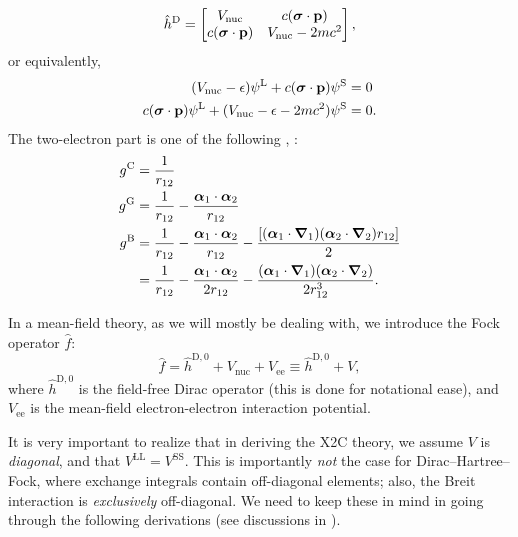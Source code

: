 \documentclass{article}
\begin{document}
\begin{equation}
    \hat{h}^{\mathrm{D}}=
    \begin{bmatrix}
        V_{\mathrm{nuc}} & c(\bm{\mathrm{\sigma}}\cdot\bm{\mathrm{p}})\\
        c(\bm{\mathrm{\sigma}}\cdot\bm{\mathrm{p}}) & V_{\mathrm{nuc}}-2mc^2
    \end{bmatrix},
\end{equation}
or equivalently,
\begin{align}
\label{eq:dirac_algebraic}
    (V_{\mathrm{nuc}}-\epsilon)\psi^{\mathrm{L}}+c(\bm{\mathrm{\sigma}}\cdot\bm{\mathrm{p}})\psi^{\mathrm{S}}&=0\\
    c(\bm{\mathrm{\sigma}}\cdot\bm{\mathrm{p}})\psi^{\mathrm{L}}+(V_{\mathrm{nuc}}-\epsilon-2mc^2)\psi^{\mathrm{S}}&=0.
\end{align}
The two-electron part is one of the following \cite[eqs. 3-7]{liuIdeasRelativisticQuantum2010}, \cite[eq. 6]{kelleyLargescaleDiracFock2013a}:
\begin{align}
    g^{\mathrm{C}}&=\frac{1}{r_{12}}\\
    g^{\mathrm{G}}&=\frac{1}{r_{12}}-\frac{\bm{\mathrm{\alpha}}_1\cdot\bm{\mathrm{\alpha}}_2}{r_{12}}\\
    g^{\mathrm{B}}&=\frac{1}{r_{12}}-\frac{\bm{\mathrm{\alpha}}_1\cdot\bm{\mathrm{\alpha}}_2}{r_{12}}-\frac{[(\bm{\mathrm{\alpha}}_1\cdot\bm{\mathrm{\nabla}}_1)(\bm{\mathrm{\alpha}}_2\cdot\bm{\mathrm{\nabla}}_2)r_{12} ]}{2}\\
    &=\frac{1}{r_{12}}-\frac{\bm{\mathrm{\alpha}}_1\cdot\bm{\mathrm{\alpha}}_2}{2r_{12}}-\frac{(\bm{\mathrm{\alpha}}_1\cdot\bm{\mathrm{\nabla}}_1)(\bm{\mathrm{\alpha}}_2\cdot\bm{\mathrm{\nabla}}_2)}{2r_{12}^3}.
\end{align}

In a mean-field theory, as we will mostly be dealing with, we introduce the Fock operator $\hat{f}$:
\begin{equation}
    \hat{f}=\hat{h}^{\mathrm{D},0}+V_{\mathrm{nuc}}+V_{\mathrm{ee}}\equiv\hat{h}^{\mathrm{D},0}+V,
\end{equation}
where $\hat{h}^{\mathrm{D},0}$ is the field-free Dirac operator (this is done for notational ease), and $V_{\mathrm{ee}}$ is the mean-field electron-electron interaction potential. 

It is very important to realize that in deriving the X2C theory, we assume $V$ is \textit{diagonal}, and that $V^{\mathrm{LL}}=V^{\mathrm{SS}}$. This is importantly \textit{not} the case for Dirac--Hartree--Fock, where exchange integrals contain off-diagonal elements; also, the Breit interaction is \textit{exclusively} off-diagonal. We need to keep these in mind in going through the following derivations (see discussions in \cite[Ch. 11.1.1]{reiherRelativisticQuantumChemistry2014}).
\end{document}
